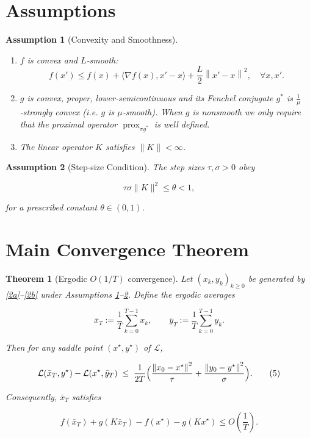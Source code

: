\documentclass{article}
\newtheorem{theorem}{Theorem}
\newtheorem{assumption}{Assumption}
\newcommand{\norm}[1]{\left\lVert#1\right\rVert}
\begin{document}
\section*{Assumptions}
\begin{assumption}[Convexity and Smoothness]\label{as:convex}
\begin{enumerate}
\item $f$ is convex and $L$‑smooth:
\[
f(x')\le f(x)+\langle\nabla f(x),x'-x\rangle+\frac{L}{2}\norm{x'-x}^{2},\quad\forall x,x'.
\tag{A1}
\]
\item $g$ is convex, proper, lower‑semicontinuous and its Fenchel conjugate $g^{*}$ is $\frac{1}{\mu}$‑strongly convex (i.e. $g$ is $\mu$‑smooth). When $g$ is nonsmooth we only require that the proximal operator $\operatorname{prox}_{\sigma g^{*}}$ is well defined.
\item The linear operator $K$ satisfies $\|K\|<\infty$.
\end{enumerate}
\end{assumption}

\begin{assumption}[Step‑size Condition]\label{as:step}
The step sizes $\tau,\sigma>0$ obey  

\[
\tau\sigma\|K\|^{2}\le \theta<1,
\tag{A2}
\]

for a prescribed constant $\theta\in(0,1)$.  
\end{assumption}

\section*{Main Convergence Theorem}
\begin{theorem}[Ergodic $O(1/T)$ convergence]\label{thm:ergodic}
Let $(x_{k},y_{k})_{k\ge0}$ be generated by \eqref{2a}–\eqref{2b} under Assumptions \ref{as:convex}–\ref{as:step}.  
Define the ergodic averages  

\[
\bar x_{T}:=\frac{1}{T}\sum_{k=0}^{T-1}x_{k},\qquad 
\bar y_{T}:=\frac{1}{T}\sum_{k=0}^{T-1}y_{k}.
\]

Then for any saddle point $(x^{\star},y^{\star})$ of $\mathcal L$,

\[
\mathcal L(\bar x_{T},y^{\star})-\mathcal L(x^{\star},\bar y_{T})
\;\le\;
\frac{1}{2T}\Bigl(
\frac{\norm{x_{0}-x^{\star}}^{2}}{\tau}
+\frac{\norm{y_{0}-y^{\star}}^{2}}{\sigma}
\Bigr).
\tag{5}
\]

Consequently, $\bar x_{T}$ satisfies  

\[
f(\bar x_{T})+g(K\bar x_{T})-f(x^{\star})-g(Kx^{\star})\le O\!\left(\frac{1}{T}\right).
\]
\end{theorem}
\end{document}

